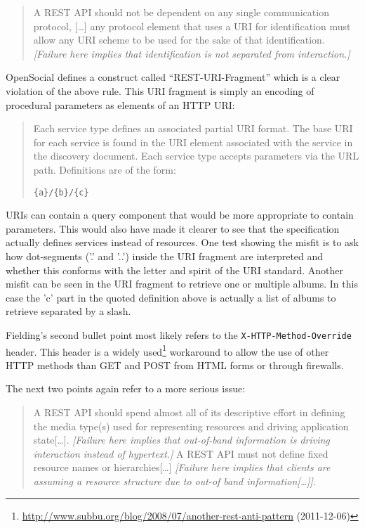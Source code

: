 \documentclass[12pt,a4paper]{scrartcl}		%
\newcommand{\citeurl}[2]{\url{#1} (#2)}
\begin{document}
\begin{quote}
  A REST API should not be dependent on any single communication protocol,
  [\ldots] any protocol element that uses a URI for identification must allow
  any URI scheme to be used for the sake of that identification.
  \textit{[Failure here implies that identification is not separated from
    interaction.]}
\end{quote}

OpenSocial defines a construct called ``REST-URI-Fragment'' which is a clear
violation of the above rule. This URI fragment is simply an encoding of
procedural parameters as elements of an HTTP URI:\cite[Core API Server, sec
2.1.1.2.2, REST-URI-Fragment]{OSSpec2.0.1}

\begin{quote}
  Each service type defines an associated partial URI format. The base URI for
  each service is found in the URI element associated with the service in the
  discovery document. Each service type accepts parameters via the URL
  path. Definitions are of the form:
  
  \verb:{a}/{b}/{c}:
\end{quote}

URIs can contain a query component that would be more appropriate to contain
parameters. This would also have made it clearer to see that the specification
actually defines services instead of resources. One test showing the misfit is
to ask how dot-segments ('.' and '..') inside the URI fragment are interpreted
and whether this conforms with the letter and spirit of the URI
standard.\cite[sec 3.3]{RFC3986} Another misfit can be seen in the URI fragment
to retrieve one or multiple albums. In this case the 'c' part in the quoted
definition above is actually a list of albums to retrieve separated by a slash.

Fielding's second bullet point most likely refers to the
\texttt{X-HTTP-Method-Override} header. This header is a widely
used\footnote{\citeurl{http://www.subbu.org/blog/2008/07/another-rest-anti-pattern}{2011-12-06}}
workaround to allow the use of other HTTP methods than GET and POST from HTML
forms or through firewalls.

The next two points again refer to a more serious issue:

\begin{quote}
  A REST API should spend almost all of its descriptive effort in defining the
  media type(s) used for representing resources and driving application
  state[\ldots].  \textit{[Failure here implies that out-of-band information is
    driving interaction instead of hypertext.]}  A REST API must not define
  fixed resource names or hierarchies[\ldots] \textit{[Failure here implies that
    clients are assuming a resource structure due to out-of band
    information[\ldots]].}
\end{quote}
\end{document}
